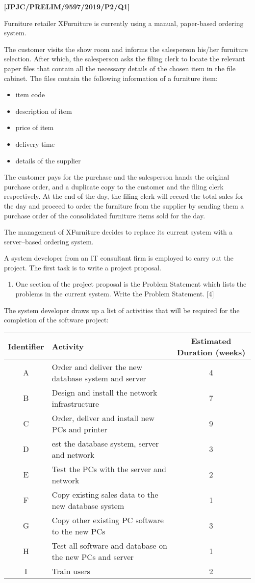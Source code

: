 \item \textbf{{[}JPJC/PRELIM/9597/2019/P2/Q1{]} }

Furniture retailer XFurniture is currently using a manual, paper-based
ordering system. 

The customer visits the show room and informs the salesperson his/her
furniture selection. After which, the salesperson asks the filing
clerk to locate the relevant paper files that contain all the necessary
details of the chosen item in the file cabinet. The files contain
the following information of a furniture item:
\begin{itemize}
\item item code 
\item description of item 
\item price of item 
\item delivery time 
\item details of the supplier
\end{itemize}
The customer pays for the purchase and the salesperson hands the original
purchase order, and a duplicate copy to the customer and the filing
clerk respectively. At the end of the day, the filing clerk will record
the total sales for the day and proceed to order the furniture from
the supplier by sending them a purchase order of the consolidated
furniture items sold for the day. 

The management of XFurniture decides to replace its current system
with a server--based ordering system. 

A system developer from an IT consultant firm is employed to carry
out the project. The first task is to write a project proposal. 
\begin{enumerate}
\item One section of the project proposal is the Problem Statement which
lists the problems in the current system. Write the Problem Statement.
\hfill{}{[}4{]}
\end{enumerate}
The system developer draws up a list of activities that will be required
for the completion of the software project:
\noindent \begin{center}
\begin{tabular}{|c|l|c|}
\hline 
Identifier & Activity & Estimated Duration (weeks)\tabularnewline
\hline 
A & Order and deliver the new database system and server & 4\tabularnewline
\hline 
B & Design and install the network infrastructure & 7\tabularnewline
\hline 
C & Order, deliver and install new PCs and printer & 9\tabularnewline
\hline 
D & est the database system, server and network & 3\tabularnewline
\hline 
E & Test the PCs with the server and network & 2\tabularnewline
\hline 
F & Copy existing sales data to the new database system & 1\tabularnewline
\hline 
G & Copy other existing PC software to the new PCs & 3\tabularnewline
\hline 
H & Test all software and database on the new PCs and server & 1\tabularnewline
\hline 
I & Train users & 2\tabularnewline
\hline 
\end{tabular}
\par\end{center}

